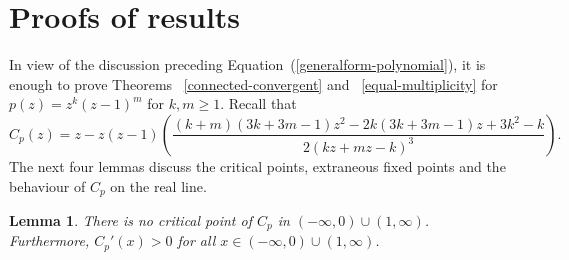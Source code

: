\documentclass[12pt]{article}
\newtheorem{lem}{Lemma}[section]
\begin{document}
\section{Proofs of results}
\label{proofs}
In view of the discussion preceding Equation~(\ref{generalform-polynomial}), it is enough to prove Theorems ~\ref{connected-convergent} and ~\ref{equal-multiplicity} for $p(z)=z^k (z-1)^m$ for $k,m \geq 1$. Recall that 
$$C_p(z)   = z-z(z-1)\left(\frac{(k+m)\left(3 k+3m -1\right) z^2
	-2k\left(3 k+3m -1\right) z+3k^2-k}
{2\left(kz+mz-k\right)^3}\right).$$
The next four lemmas discuss the critical points, extraneous fixed points and the behaviour of $C_p$ on the real line.

\begin{lem}
There is no critical point of $C_p$ in $(-\infty, 0) \cup (1, \infty)$. Furthermore, $C_p '(x)>0$ for all $x \in (-\infty, 0) \cup (1, \infty)$. 
\label{criticalpointsC_p}
\end{lem}
\end{document}

